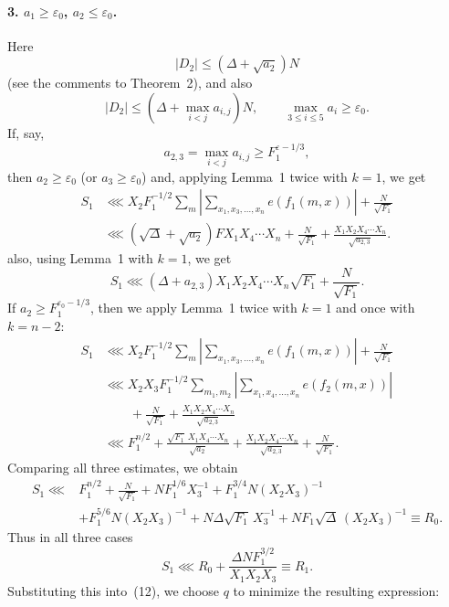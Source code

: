 \documentclass[10pt]{article}
\begin{document}
\paragraph{3. $a_1\geqslant\varepsilon_0$, $a_2\leqslant\varepsilon_0$.}
Here
\[
  |D_2|\leqslant(\Delta+\sqrt{a_2})N
\]
(see the comments to Theorem~2), and also
\[
  |D_2|\leqslant\left(\Delta+\max_{i<j}a_{i,j}\right)N,
  \qquad \max_{3\leqslant i\leqslant5}a_i\geqslant\varepsilon_0.
\]
If, say,
\[
  a_{2,3}=\max_{i<j}a_{i,j}\geqslant F_1^{\varepsilon-1/3},
\]
then $a_2\geqslant\varepsilon_0$ (or $a_3\geqslant\varepsilon_0$) and, applying Lemma~1 twice with $k=1$, we get
\[
\begin{aligned}
  S_1
  &\lll X_2F_1^{-1/2}\sum_m
    \left|\sum_{x_1,x_3,\ldots,x_n}e(f_1(m,x))\right|
    +\frac{N}{\sqrt{F_1}}\\
  &\lll(\sqrt\Delta+\sqrt{a_2})F X_1X_4\cdots X_n
    +\frac{N}{\sqrt{F_1}}
    +\frac{X_1X_2X_4\cdots X_n}{\sqrt{a_{2,3}}}.
\end{aligned}
\]
also, using Lemma~1 with $k=1$, we get
\[
  S_1\lll(\Delta+a_{2,3})X_1X_2X_4\cdots X_n\sqrt{F_1}
  +\frac{N}{\sqrt{F_1}}.
\]
If $a_2\geqslant F_1^{\varepsilon_0-1/3}$, then we apply Lemma~1 twice with $k=1$ and once with $k=n-2$:
\[
\begin{aligned}
  S_1
  &\lll X_2F_1^{-1/2}\sum_m
    \left|\sum_{x_1,x_3,\ldots,x_n}e(f_1(m,x))\right|
    +\frac{N}{\sqrt{F_1}}\\
  &\lll X_2X_3F_1^{-1/2}\sum_{m_1,m_2}
    \left|\sum_{x_1,x_4,\ldots,x_n}e(f_2(m,x))\right|\\
  &\qquad+\frac{N}{\sqrt{F_1}}
    +\frac{X_1X_2X_4\cdots X_n}{\sqrt{a_{2,3}}}\\
  &\lll F_1^{n/2}
    +\frac{\sqrt{F_1}\,X_1X_4\cdots X_n}{\sqrt{a_2}}
    +\frac{X_1X_2X_4\cdots X_n}{\sqrt{a_{2,3}}}
    +\frac{N}{\sqrt{F_1}}.
\end{aligned}
\]
Comparing all three estimates, we obtain
\[
\begin{aligned}
  S_1\lll{}&F_1^{n/2}+\frac{N}{\sqrt{F_1}}
  +NF_1^{1/6}X_3^{-1}
  +F_1^{3/4}N(X_2X_3)^{-1}\\
  &+F_1^{5/6}N(X_2X_3)^{-1}
  +N\Delta\sqrt{F_1}\,X_3^{-1}
  +NF_1\sqrt\Delta\,(X_2X_3)^{-1}
  \equiv R_0.
\end{aligned}
\]
Thus in all three cases
\[
  S_1\lll R_0+\frac{\Delta NF_1^{3/2}}{X_1X_2X_3}\equiv R_1.
\]
Substituting this into~(12), we choose $q$ to minimize the resulting expression:
\end{document}
